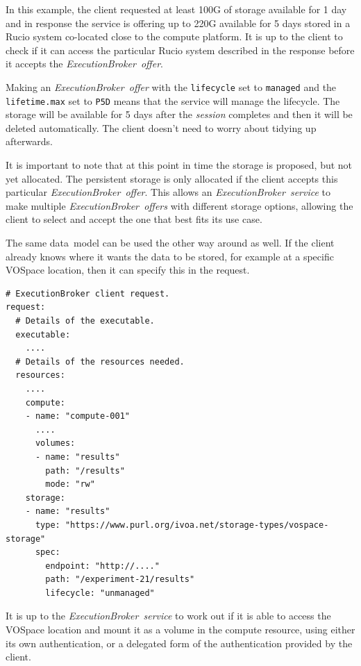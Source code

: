 \documentclass[11pt,a4paper]{ivoa}
\newcommand{\datamodel} {data~model}
\newcommand{\vospace} {VOSpace}
\newcommand{\execbrokerservice}[1] {\textit{ExecutionBroker~service#1}}
\newcommand{\execoffer}[1] {\textit{ExecutionBroker~offer#1}}
\newcommand{\workerjob}[1] {\textit{session#1}}
\newcommand{\rucio} {Rucio}
\newcommand{\codeword}[1] {\texttt{#1}}
\begin{document}
In this example, the client requested at least 100G of storage available for 1 day
and in response the service is offering up to 220G available for 5 days stored in a
\rucio{} system co-located close to the compute platform.
It is up to the client to check if it can access the particular \rucio{} system
described in the response before it accepts the \execoffer{}.

Making an \execoffer{} with the \codeword{lifecycle} set to \codeword{managed} and the
\codeword{lifetime.max} set to \codeword{P5D}
means that the service will manage the lifecycle.
The storage will be available for 5 days after the \workerjob{} completes and then it
will be deleted automatically.
The client doesn't need to worry about tidying up afterwards.

It is important to note that at this point in time the storage is proposed, but not yet allocated.
The persistent storage is only allocated if the client accepts this particular \execoffer{}.
This allows an \execbrokerservice{} to make multiple \execoffer{s} with different storage options,
allowing the client to select and accept the one that best fits its use case.

The same \datamodel{} can be used the other way around as well.
If the client already knows where it wants the data to be stored, for example at a specific
\vospace{} location, then it can specify this in the request.

\begin{lstlisting}[]
# ExecutionBroker client request.
request:
  # Details of the executable.
  executable:
    ....
  # Details of the resources needed.
  resources:
    ....
    compute:
    - name: "compute-001"
      ....
      volumes:
      - name: "results"
        path: "/results"
        mode: "rw"
    storage:
    - name: "results"
      type: "https://www.purl.org/ivoa.net/storage-types/vospace-storage"
      spec:
        endpoint: "http://...."
        path: "/experiment-21/results"
        lifecycle: "unmanaged"
\end{lstlisting}

It is up to the \execbrokerservice{} to work out if it is able to access the
\vospace{} location and mount it as a volume in the compute resource,
using either its own authentication, or a delegated form of the authentication
provided by the client.
\end{document}
